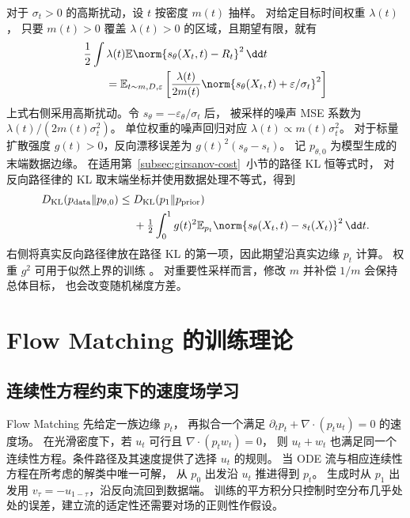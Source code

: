 对于 \(\sigma_t>0\) 的高斯扰动，设 \(t\) 按密度 \(m(t)\) 抽样。
对给定目标时间权重 \(\lambda(t)\)，
只要 \(m(t)>0\) 覆盖 \(\lambda(t)>0\) 的区域，且期望有限，就有
\begin{equation}
  \begin{aligned}
  &\frac12\int \lambda(t)\mathbb E\norm{s_\theta(X_t,t)-R_t}^2\,\dd t\\
  &\qquad=\mathbb E_{t\sim m,D,\varepsilon}
     \left[\frac{\lambda(t)}{2m(t)}
            \norm{s_\theta(X_t,t)+\varepsilon/\sigma_t}^2\right]
  \end{aligned}
  \label{eq:training-score-time-weight}
\end{equation}
上式右侧采用高斯扰动。令 \(s_\theta=-\varepsilon_\theta/\sigma_t\) 后，
被采样的噪声 MSE 系数为 \(\lambda(t)/(2m(t)\sigma_t^2)\)。
单位权重的噪声回归对应 \(\lambda(t)\propto m(t)\sigma_t^2\)。
对于标量扩散强度 \(g(t)>0\)，反向漂移误差为 \(g(t)^2(s_\theta-s_t)\)。
记 \(p_{\theta,0}\) 为模型生成的末端数据边缘。
在适用第~\ref{subsec:girsanov-cost}~小节的路径 KL 恒等式时，
对反向路径律的 KL 取末端坐标并使用数据处理不等式，得到
\[
  \begin{aligned}
  D_{\mathrm{KL}}(p_{\mathrm{data}}\|p_{\theta,0})
  \le {}&D_{\mathrm{KL}}(p_1\|p_{\mathrm{prior}})\\
       &+\tfrac12\int_0^1 g(t)^2
          \mathbb E_{p_t}\norm{s_\theta(X_t,t)-s_t(X_t)}^2\,\dd t .
  \end{aligned}
\]
右侧将真实反向路径律放在路径 KL 的第一项，因此期望沿真实边缘 \(p_t\) 计算。
权重 \(g^2\) 可用于似然上界的训练
\cite{song2021likelihood}。
对重要性采样而言，修改 \(m\) 并补偿 \(1/m\) 会保持总体目标，
也会改变随机梯度方差。
\section{Flow Matching 的训练理论}
\label{sec:training-fm}

\subsection{连续性方程约束下的速度场学习}

Flow Matching \cite{lipman2023fm} 先给定一族边缘 \(p_t\)，
再拟合一个满足 \(\partial_t p_t+\nabla\cdot(p_tu_t)=0\) 的速度场。
在光滑密度下，若 \(u_t\) 可行且 \(\nabla\cdot(p_t w_t)=0\)，
则 \(u_t+w_t\) 也满足同一个连续性方程。条件路径及其速度提供了选择 \(u_t\) 的规则。
当 ODE 流与相应连续性方程在所考虑的解类中唯一可解，
从 \(p_0\) 出发沿 \(u_t\) 推进得到 \(p_t\)。
生成时从 \(p_1\) 出发用 \(v_\tau=-u_{1-\tau}\)，沿反向流回到数据端。
训练的平方积分只控制时空分布几乎处处的误差，建立流的适定性还需要对场的正则性作假设。

